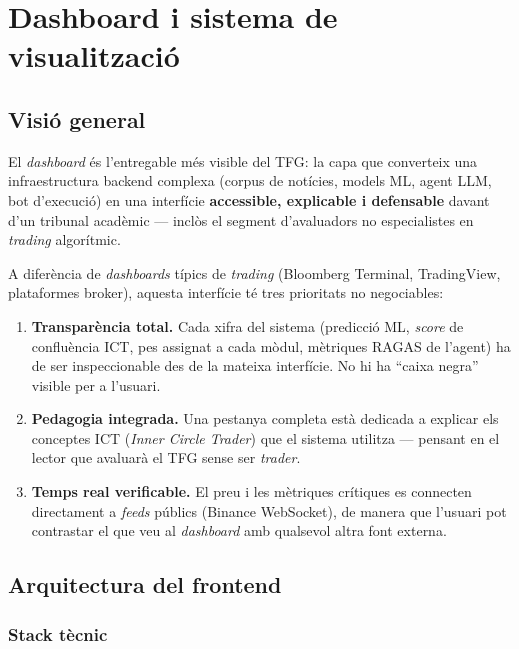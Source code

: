 \documentclass[12pt, a4paper]{report}
\begin{document}
\chapter{Dashboard i sistema de visualització}\label{ch:dashboard}
\label{cap:dashboard}

\section{Visió general}

El \textit{dashboard} és l'entregable més visible del TFG: la capa que converteix una infraestructura backend complexa (corpus de notícies, models ML, agent LLM, bot d'execució) en una interfície \textbf{accessible, explicable i defensable} davant d'un tribunal acadèmic --- inclòs el segment d'avaluadors no especialistes en \textit{trading} algorítmic.

A diferència de \textit{dashboards} típics de \textit{trading} (Bloomberg Terminal, TradingView, plataformes broker), aquesta interfície té tres prioritats no negociables:

\begin{enumerate}
  \item \textbf{Transparència total.} Cada xifra del sistema (predicció ML, \textit{score} de confluència ICT, pes assignat a cada mòdul, mètriques RAGAS de l'agent) ha de ser inspeccionable des de la mateixa interfície. No hi ha ``caixa negra'' visible per a l'usuari.
  \item \textbf{Pedagogia integrada.} Una pestanya completa està dedicada a explicar els conceptes ICT (\textit{Inner Circle Trader}) que el sistema utilitza --- pensant en el lector que avaluarà el TFG sense ser \textit{trader}.
  \item \textbf{Temps real verificable.} El preu i les mètriques crítiques es connecten directament a \textit{feeds} públics (Binance WebSocket), de manera que l'usuari pot contrastar el que veu al \textit{dashboard} amb qualsevol altra font externa.
\end{enumerate}

\section{Arquitectura del frontend}

\subsection{Stack tècnic}
\end{document}

